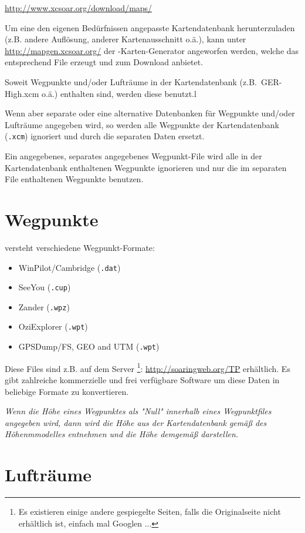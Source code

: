 \url{http://www.xcsoar.org/download/maps/}

Um eine den eigenen Bedürfnissen angepasste Kartendatenbank herunterzuladen (z.B. andere Auflösung,
anderer Kartenausschnitt o.ä.), kann unter \url{http://mapgen.xcsoar.org/}  der \xc-Karten-Generator
angeworfen werden, welche das entsprechend File erzeugt und zum Download
anbietet.

Soweit Wegpunkte und/oder Lufträume in der Kartendatenbank (z.B.\ GER-High.xcm o.ä.) enthalten sind,
werden diese benutzt.l

Wenn aber separate oder eine alternative Datenbanken für Wegpunkte und/oder Lufträume angegeben
wird, so werden alle Wegpunkte der Kartendatenbank (\verb".xcm") ignoriert und durch die separaten
Daten ersetzt.

Ein \xc angegebenes, separates angegebenes Wegpunkt-File wird alle in der Kartendatenbank enthaltenen
Wegpunkte ignorieren und nur die im separaten File enthaltenen Wegpunkte benutzen.


\section{Wegpunkte}
\xc  versteht verschiedene Wegpunkt-Formate:

\begin{itemize}
\item WinPilot/Cambridge (\verb|.dat|)
\item SeeYou (\verb|.cup|)
\item Zander (\verb|.wpz|)
\item OziExplorer (\verb|.wpt|)
\item GPSDump/FS, GEO and UTM (\verb|.wpt|)
\end{itemize}

Diese Files sind z.B. auf dem Server \footnote{Es existieren einige andere gespiegelte Seiten, falls die
Originalseite nicht erhältlich ist, einfach mal Googlen ...}: \url{http://soaringweb.org/TP} erhältlich. Es
gibt zahlreiche kommerzielle und frei verfügbare Software um diese Daten in beliebige Formate zu
konvertieren.

\achtung \textsl{Wenn die Höhe eines Wegpunktes als "Null" innerhalb eines Wegpunktfiles angegeben
wird, dann wird  \xc  die Höhe aus der Kartendatenbank gemäß des Höhenmmodelles entnehmen und die
Höhe demgemäß darstellen.}

\section{Lufträume}

